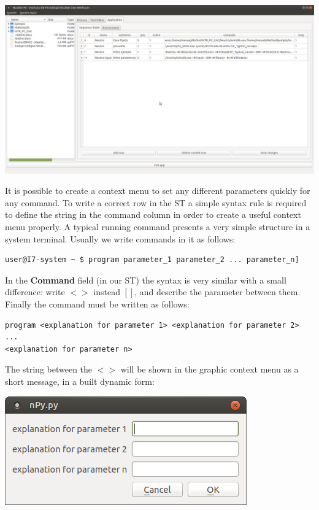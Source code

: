 \documentclass[a4paper,10pt]{article}
\begin{document}
\begin{center}
 \includegraphics[width=\textwidth]{img/sequenceTable.png}
\end{center}

It is possible to create a context menu to set any different parameters quickly for any command. To write a correct row in the ST a simple syntax rule is required to define the string in the command column in order to create a useful context menu properly. A typical running command presents a very simple structure in a system terminal. Usually we write commands in it as follows:

\begin{verbatim}
user@I7-system ~ $ program parameter_1 parameter_2 ... parameter_n]
\end{verbatim}

In the \textbf{Command} field (in our ST) the syntax is very similar with a small difference: write $< >$ instead $[]$, and describe the parameter between them. Finally the command must be written as follows:

\begin{verbatim}
program <explanation for parameter 1> <explanation for parameter 2> 
... 
<explanation for parameter n>
 \end{verbatim}

The string between the $< >$ will be shown in the graphic context menu as a short message, in a built dynamic form: 
\begin{center}
 \includegraphics[width=\textwidth]{img/contextMenuExampleString.png}
\end{center}
\end{document}
